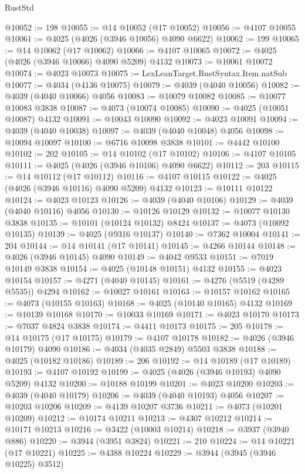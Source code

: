 \begin{lexlean}{RustStd}
\begin{coremodule}
@10052 := 198
@10055 := @14 @10052 (@17 @10052)
@10056 := @4107 @10055
@10061 := @4025 (@4026 (@3946 @10056) @4090 @6622)
@10062 := 199
@10065 := @14 @10062 (@17 @10062)
@10066 := @4107 @10065
@10072 := @4025 (@4026 (@3946 @10066) @4090 @5209) @4132
@10073 := @10061 @10072
@10074 := @4023 @10073
@10075 := LexLeanTarget.RustSyntax.Item.natSub
@10077 := @4034 (@4136 @10075)
@10079 := @4039 (@4040 @10056)
@10082 := @4039 (@4040 @10066) @4056
@10083 := @10079 @10082
@10085 := @10077 @10083 @3838
@10087 := @4073 (@10074 @10085)
@10090 := @4025 (@10051 @10087) @4132
@10091 := @10043 @10090
@10092 := @4023 @10091
@10094 := @4039 (@4040 @10038)
@10097 := @4039 (@4040 @10048) @4056
@10098 := @10094 @10097
@10100 := @6716 @10098 @3838
@10101 := @4442 @10100
@10102 := 202
@10105 := @14 @10102 (@17 @10102)
@10106 := @4107 @10105
@10111 := @4025 (@4026 (@3946 @10106) @4090 @6622)
@10112 := 203
@10115 := @14 @10112 (@17 @10112)
@10116 := @4107 @10115
@10122 := @4025 (@4026 (@3946 @10116) @4090 @5209) @4132
@10123 := @10111 @10122
@10124 := @4023 @10123
@10126 := @4039 (@4040 @10106)
@10129 := @4039 (@4040 @10116) @4056
@10130 := @10126 @10129
@10132 := @10077 @10130 @3838
@10135 := @10101 (@10124 @10132) @8424
@10137 := @4073 (@10092 @10135)
@10139 := @4025 (@9316 @10137)
@10140 := @7362 @10004
@10141 := 204
@10144 := @14 @10141 (@17 @10141)
@10145 := @4266 @10144
@10148 := @4026 (@3946 @10145) @4090
@10149 := @4042 @9533
@10151 := @7019 @10149 @3838
@10154 := @4025 (@10148 @10151) @4132
@10155 := @4023 @10154
@10157 := @4271 (@4040 @10145)
@10161 := @4276 (@5519 (@4289 @5535)) @4294
@10162 := @10027 @10161
@10163 := @10157 @10162
@10165 := @4073 (@10155 @10163)
@10168 := @4025 (@10140 @10165) @4132
@10169 := @10139 @10168
@10170 := @10033 @10169
@10171 := @4023 @10170
@10173 := @7037 @4824 @3838
@10174 := @4411 @10173
@10175 := 205
@10178 := @14 @10175 (@17 @10175)
@10179 := @4107 @10178
@10182 := @4026 (@3946 @10179) @4090
@10186 := @4034 (@4035 @2849) @5503 @3838
@10188 := @4025 (@10182 @10186)
@10189 := 206
@10192 := @14 @10189 (@17 @10189)
@10193 := @4107 @10192
@10199 := @4025 (@4026 (@3946 @10193) @4090 @5209) @4132
@10200 := @10188 @10199
@10201 := @4023 @10200
@10203 := @4039 (@4040 @10179)
@10206 := @4039 (@4040 @10193) @4056
@10207 := @10203 @10206
@10209 := @4139 @10207 @3736
@10211 := @4073 (@10201 @10209)
@10212 := @10174 @10211
@10213 := @4307 @10212
@10214 := @10171 @10213
@10216 := @3422 (@10003 @10214)
@10218 := @3937 (@3940 @886)
@10220 := @3944 (@3951 @3824)
@10221 := 210
@10224 := @14 @10221 (@17 @10221)
@10225 := @4388 @10224
@10229 := @3944 (@3945 (@3946 @10225) @3512)

\end{coremodule}
\end{lexlean}
